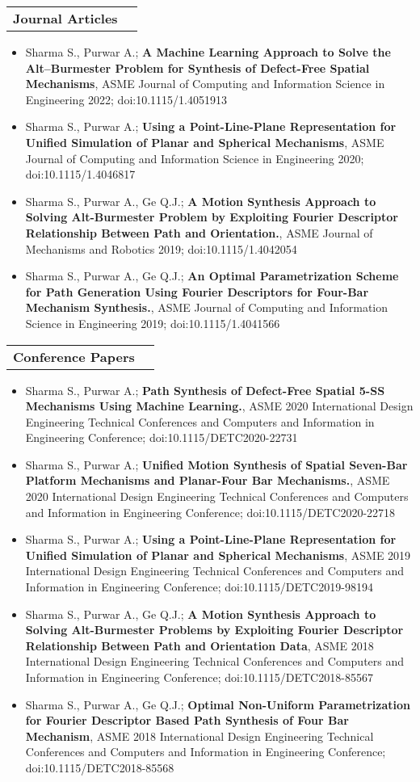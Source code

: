\documentclass[letterpaper,10pt]{article}
\makeatletter
\newcommand{\resumeHeadingwithDate}[2]{
	\vspace{-1pt}
	\begin{tabular*}{0.97\textwidth}{l@{\extracolsep{\fill}}r}
		\textbf{#1} &  \textit{\small#2} \vspace{-2pt}\\
	\end{tabular*}
	\vspace{+2pt}
}
\newcommand{\resumeItemListStart}{
\vspace{-7pt}
\begin{itemize}[leftmargin=14pt]
}
\newcommand{\resumeItemListEnd}{
\vspace{+7pt}
\end{itemize}
}
\newcommand{\resumeItem}[1]{
  \item\small{
      {#1 \vspace{-7pt}
      }
  }
}
\makeatother
\begin{document}
\resumeHeadingwithDate{Journal Articles}{}
\resumeItemListStart
\resumeItem{Sharma S., Purwar A.;  \textbf{A Machine Learning Approach to Solve the Alt–Burmester Problem for Synthesis of Defect-Free Spatial Mechanisms}, ASME Journal of Computing and Information Science in Engineering 2022; doi:10.1115/1.4051913}
\resumeItem{Sharma S., Purwar A.; \textbf{Using a Point-Line-Plane Representation for Unified Simulation of Planar and Spherical Mechanisms}, ASME Journal of Computing and Information Science in Engineering 2020; doi:10.1115/1.4046817}
\resumeItem{Sharma S., Purwar A., Ge Q.J.; \textbf{A Motion Synthesis Approach to Solving Alt-Burmester Problem by Exploiting Fourier Descriptor Relationship Between Path and Orientation.}, ASME Journal of Mechanisms and Robotics 2019; doi:10.1115/1.4042054}
\resumeItem{Sharma S., Purwar A., Ge Q.J.; \textbf{An Optimal Parametrization Scheme for Path Generation Using Fourier Descriptors for Four-Bar Mechanism Synthesis.}, ASME Journal of Computing and Information Science in Engineering 2019; doi:10.1115/1.4041566}
\resumeItemListEnd

\resumeHeadingwithDate{Conference Papers}{}
\resumeItemListStart
\resumeItem{Sharma S., Purwar A.; \textbf{Path Synthesis of Defect-Free Spatial 5-SS Mechanisms Using Machine Learning.}, ASME 2020 International Design Engineering Technical Conferences and Computers and Information in Engineering Conference; doi:10.1115/DETC2020-22731}
\resumeItem{Sharma S., Purwar A.; \textbf{Unified Motion Synthesis of Spatial Seven-Bar Platform Mechanisms and Planar-Four Bar Mechanisms.}, ASME 2020 International Design Engineering Technical Conferences and Computers and Information in Engineering Conference; doi:10.1115/DETC2020-22718}
\resumeItem{Sharma S., Purwar A.; \textbf{Using a Point-Line-Plane Representation for Unified Simulation of Planar and Spherical Mechanisms}, ASME 2019 International Design Engineering Technical Conferences and Computers and Information in Engineering Conference; doi:10.1115/DETC2019-98194}
\resumeItem{Sharma S., Purwar A., Ge Q.J.; \textbf{A Motion Synthesis Approach to Solving Alt-Burmester Problems by Exploiting Fourier Descriptor Relationship Between Path and Orientation Data}, ASME 2018 International Design Engineering Technical Conferences and Computers and Information in Engineering Conference; doi:10.1115/DETC2018-85567}
\resumeItem{Sharma S., Purwar A., Ge Q.J.; \textbf{Optimal Non-Uniform Parametrization for Fourier Descriptor Based Path Synthesis of Four Bar Mechanism}, ASME 2018 International Design Engineering Technical Conferences and Computers and Information in Engineering Conference; doi:10.1115/DETC2018-85568}
\resumeItemListEnd
\end{document}
